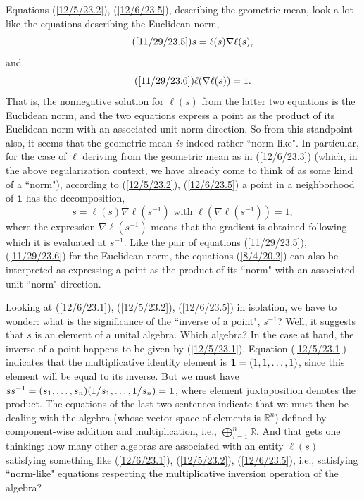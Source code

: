 \documentclass{amsart}
\numberwithin{equation}{section}
\theoremstyle{definition}
\numberwithin{theorem}{section}
\begin{document}
{ 
 Equations (\ref{12/5/23.2}), (\ref{12/6/23.5}), describing the geometric mean, look a lot like the equations describing the Euclidean norm,  \begin{equation}\tag{\ref{11/29/23.5}}  s = \ell(s)\nabla\ell(s),\end{equation} and \begin{equation}\tag{\ref{11/29/23.6}} \ell(\nabla\ell(s)) = 1.\end{equation}  That is, the nonnegative solution for $\ell(s)$ from the latter two equations is the Euclidean norm, and the two equations express a point as the product of its Euclidean norm with an associated unit-norm direction.
So from this standpoint also, it seems that the geometric mean {\it is} indeed rather ``norm-like".  In particular, for the case of $\ell$ deriving from the geometric mean as in (\ref{12/6/23.3}) (which, in the above regularization context, we have already come to think of as some kind of a ``norm"), according to (\ref{12/5/23.2}), (\ref{12/6/23.5}) a point in a neighborhood of $\mathbf{1}$ has the decomposition,
\begin{equation}\label{8/4/20.2} s = \ell(s)\nabla \ell(s^{-1}) \mbox{  with   }  \ell(\nabla \ell(s^{-1})) = 1,\end{equation} where the expression $\nabla \ell(s^{-1})$ means that the gradient is obtained following which it is evaluated at $s^{-1}$.  Like the pair of equations (\ref{11/29/23.5}), (\ref{11/29/23.6}) for the Euclidean norm, the equations (\ref{8/4/20.2}) can also be interpreted as expressing a point as the product of its ``norm" with an associated unit-``norm"  direction.


Looking at (\ref{12/6/23.1}), (\ref{12/5/23.2}),  (\ref{12/6/23.5}) in isolation, we have to wonder: what is the significance of the ``inverse of a point", $s^{-1}$?  Well, it suggests that $s$ is an element of a unital algebra.  Which algebra?  In the case at hand, the inverse of a point happens to be given by (\ref{12/5/23.1}).   Equation (\ref{12/5/23.1}) indicates that the multiplicative identity element is ${\bf 1}= (1,1,\dots, 1)$, since this element will be equal to its inverse.  But we must have  $ss^{-1} = (s_1,\dots,s_n)(1/s_1,\dots,1/s_n) = {\bf 1}$, where element juxtaposition denotes the product. The equations of the last two sentences indicate that we must then be dealing with the algebra (whose vector space of elements is $\mathbb{R}^n$) defined by component-wise addition and multiplication, i.e., $\bigoplus_{i=1}^n \mathbb{R}$.    And that gets one thinking: how many other algebras are associated with an entity $\ell(s)$ satisfying something like (\ref{12/6/23.1}), (\ref{12/5/23.2}),  (\ref{12/6/23.5}), i.e., satisfying ``norm-like" equations respecting the multiplicative inversion operation of the algebra?
 

}
\end{document}
